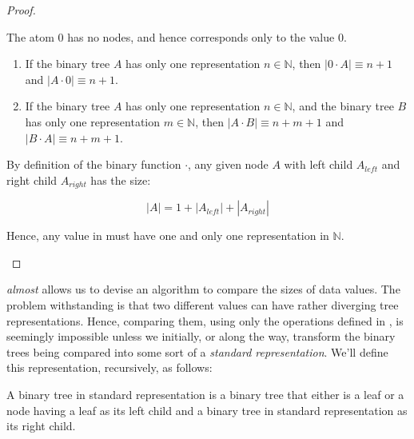 \begin{proof}\ \\

\begin{description}[\setleftmargin{70pt}\setlabelstyle{\bf}]

\item [Base] The atom $0$ has no nodes, and hence corresponds only to the value
$0$.

\item [Assumption]

\begin{enumerate}

\item If the binary tree $A$ has only one representation $n\in\mathbb{N}$, then
$\left|0\cdot A\right|\equiv n+1$ and $\left|A\cdot 0\right|\equiv n+1$.

\item If the binary tree $A$ has only one representation $n\in\mathbb{N}$, and
the binary tree $B$ has only one representation $m\in\mathbb{N}$, then
$\left|A\cdot B\right|\equiv n+m+1$ and $\left|B\cdot A\right|\equiv n+m+1$.

\end{enumerate}

\item [Induction]

By definition of the binary function $\cdot$, any given node $A$ with left
child $A_{left}$ and right child $A_{right}$ has the size:

$$\left|A\right|=1+\left|A_{left}\right|+\left|A_{right}\right|$$

Hence, any value in \D{} must have one and only one representation in
$\mathbb{N}$.

\end{description}

\end{proof}

 \emph{almost} allows us to devise an algorithm to
compare the sizes of data values. The problem withstanding is that two
different values can have rather diverging tree representations. Hence,
comparing them, using only the operations defined in , is
seemingly impossible unless we initially, or along the way, transform the
binary trees being compared into some sort of a \emph{standard representation}.
We'll define this representation, recursively, as follows:

\begin{definition}\label{definition:standard-representation}

A binary tree in standard representation is a binary tree that either is a leaf
or a node having a leaf as its left child and a binary tree in standard
representation as its right child.

\end{definition}

